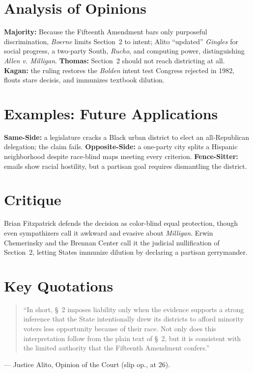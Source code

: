 \documentclass[12pt]{article}
\begin{document}
\section{Analysis of Opinions}
\textbf{Majority:} Because the Fifteenth Amendment bars only purposeful discrimination, \textit{Boerne} limits Section~2 to intent; Alito ``updated'' \textit{Gingles} for social progress, a two-party South, \textit{Rucho}, and computing power, distinguishing \textit{Allen v. Milligan}. \textbf{Thomas:} Section~2 should not reach districting at all. \textbf{Kagan:} the ruling restores the \textit{Bolden} intent test Congress rejected in 1982, flouts stare decisis, and immunizes textbook dilution.

\section{Examples: Future Applications}
\textbf{Same-Side:} a legislature cracks a Black urban district to elect an all-Republican delegation; the claim fails. \textbf{Opposite-Side:} a one-party city splits a Hispanic neighborhood despite race-blind maps meeting every criterion. \textbf{Fence-Sitter:} emails show racial hostility, but a partisan goal requires dismantling the district.

\section{Critique}
Brian Fitzpatrick defends the decision as color-blind equal protection, though even sympathizers call it awkward and evasive about \textit{Milligan}. Erwin Chemerinsky and the Brennan Center call it the judicial nullification of Section~2, letting States immunize dilution by declaring a partisan gerrymander.

\section{Key Quotations}
\begin{quote}
``In short, \S~2 imposes liability only when the evidence supports a strong inference that the State intentionally drew its districts to afford minority voters less opportunity because of their race. Not only does this interpretation follow from the plain text of \S~2, but it is consistent with the limited authority that the Fifteenth Amendment confers.''
\end{quote}
\noindent --- Justice Alito, Opinion of the Court (slip op., at 26).
\end{document}
